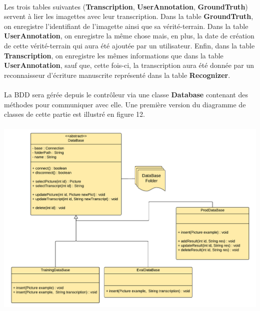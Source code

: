 \paragraph{}

Les trois tables suivantes (\textbf{Transcription}, \textbf{UserAnnotation},
\textbf{GroundTruth}) servent à lier les imagettes avec leur transcription.
Dans la table \textbf{GroundTruth}, on enregistre l’identifiant de l’imagette
ainsi que sa vérité-terrain. Dans la table \textbf{UserAnnotation}, on
enregistre la même chose mais, en plus, la date de création de cette
vérité-terrain qui aura été ajoutée par un utilisateur. Enfin, dans la
table \textbf{Transcription}, on enregistre les mêmes informations que dans
la table \textbf{UserAnnotation}, sauf que, cette fois-ci, la transcription
aura été donnée par un reconnaisseur d’écriture manuscrite représenté dans
la table \textbf{Recognizer}.

\paragraph{}

La BDD sera gérée depuis le contrôleur via une classe \textbf{Database}
contenant des méthodes pour communiquer avec elle. Une première version du
diagramme de classes de cette partie est illustré en figure 12.

\paragraph{}

\begin{mdframed}[frametitle={Figure 13 : Diagramme de classes de l'interface avec la BDD}, innerbottommargin=10]
\begin{center}
\includegraphics[scale=0.5]{bdd.pdf}
\end{center}
\end{mdframed}

